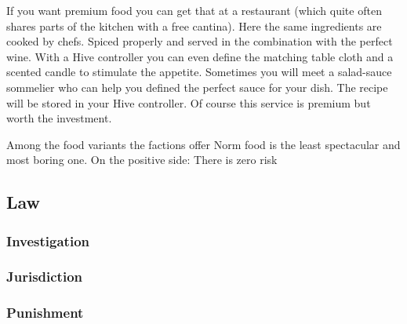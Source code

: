 If you want premium food you can get that at a restaurant (which quite often shares parts of the kitchen with a free cantina). Here the same ingredients are cooked by chefs. Spiced properly and served in the combination with the perfect wine. With a Hive controller you can even define the matching table cloth and a scented candle to stimulate the appetite.
Sometimes you will meet a salad-sauce sommelier who can help you defined the perfect sauce for your dish. The recipe will be stored in your Hive controller. Of course this service is premium but worth the investment.

Among the food variants the factions offer Norm food is the least spectacular and most boring one. On the positive side: There is zero risk

\subsection{Law}
\label{sec: norm law}

\subsubsection{Investigation}


\subsubsection{Jurisdiction}


\subsubsection{Punishment}





